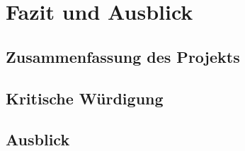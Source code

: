 \chapter{Fazit und Ausblick}


\section{Zusammenfassung des Projekts}

\section{Kritische Würdigung}

\section{Ausblick}


